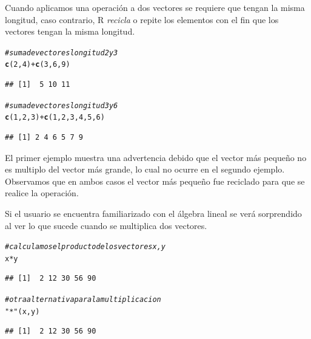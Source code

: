 \documentclass[11pt,a4paper,oneside]{book}\usepackage[]{graphicx}\usepackage[]{color}
\makeatletter
\newcommand{\hlnum}[1]{\textcolor[rgb]{0.686,0.059,0.569}{#1}}%
\newcommand{\hlstr}[1]{\textcolor[rgb]{0.192,0.494,0.8}{#1}}%
\newcommand{\hlcom}[1]{\textcolor[rgb]{0.678,0.584,0.686}{\textit{#1}}}%
\newcommand{\hlopt}[1]{\textcolor[rgb]{0,0,0}{#1}}%
\newcommand{\hlstd}[1]{\textcolor[rgb]{0.345,0.345,0.345}{#1}}%
\newcommand{\hlkwd}[1]{\textcolor[rgb]{0.737,0.353,0.396}{\textbf{#1}}}%
\newenvironment{kframe}{%
 \def\at@end@of@kframe{}%
 \ifinner\ifhmode%
  \def\at@end@of@kframe{\end{minipage}}%
  \begin{minipage}{\columnwidth}%
 \fi\fi%
 \def\FrameCommand##1{\hskip\@totalleftmargin \hskip-\fboxsep
 \colorbox{shadecolor}{##1}\hskip-\fboxsep
     \hskip-\linewidth \hskip-\@totalleftmargin \hskip\columnwidth}%
 \MakeFramed {\advance\hsize-\width
   \@totalleftmargin\z@ \linewidth\hsize
   \@setminipage}}%
 {\par\unskip\endMakeFramed%
 \at@end@of@kframe}
\newenvironment{knitrout}{}{} %
\makeatother
\begin{document}
\begin{itemize}
Cuando aplicamos una operación a dos vectores se requiere que tengan la misma longitud, caso contrario, R \emph{recicla} o repite los elementos con el fin que los vectores tengan la misma longitud.
\begin{knitrout}
\color{fgcolor}\begin{kframe}
\begin{alltt}
\hlcom{# suma de vectores longitud 2 y 3}
\hlkwd{c}\hlstd{(}\hlnum{2}\hlstd{,} \hlnum{4}\hlstd{)} \hlopt{+} \hlkwd{c}\hlstd{(}\hlnum{3}\hlstd{,} \hlnum{6}\hlstd{,} \hlnum{9}\hlstd{)}
\end{alltt}


{\ttfamily\noindent\color{warningcolor}{\#\# Warning in c(2, 4) + c(3, 6, 9): longer object length is not a multiple of shorter object length}}\begin{verbatim}
## [1]  5 10 11
\end{verbatim}
\begin{alltt}
\hlcom{# suma de vectores longitud 3 y 6}
\hlkwd{c}\hlstd{(}\hlnum{1}\hlstd{,} \hlnum{2}\hlstd{,} \hlnum{3}\hlstd{)} \hlopt{+} \hlkwd{c}\hlstd{(}\hlnum{1}\hlstd{,} \hlnum{2}\hlstd{,} \hlnum{3}\hlstd{,} \hlnum{4}\hlstd{,} \hlnum{5}\hlstd{,} \hlnum{6}\hlstd{)}
\end{alltt}
\begin{verbatim}
## [1] 2 4 6 5 7 9
\end{verbatim}
\end{kframe}
\end{knitrout}

El primer ejemplo muestra una advertencia debido que el vector más pequeño no es multiplo del vector más grande, lo cual no ocurre en el segundo ejemplo. Observamos que en ambos casos el vector más pequeño fue reciclado para que se realice la operación.\newline

Si el usuario se encuentra familiarizado con el álgebra lineal se verá sorprendido al ver lo que sucede cuando se multiplica dos vectores.
\begin{knitrout}
\color{fgcolor}\begin{kframe}
\begin{alltt}
\hlcom{# calculamos el producto de los vectores x, y}
\hlstd{x}\hlopt{*}\hlstd{y}
\end{alltt}
\begin{verbatim}
## [1]  2 12 30 56 90
\end{verbatim}
\begin{alltt}
\hlcom{# otra alternativa para la multiplicacion}
\hlstr{"*"} \hlstd{(x, y)}
\end{alltt}
\begin{verbatim}
## [1]  2 12 30 56 90
\end{verbatim}
\end{kframe}
\end{knitrout}


\end{itemize}
\end{document}

